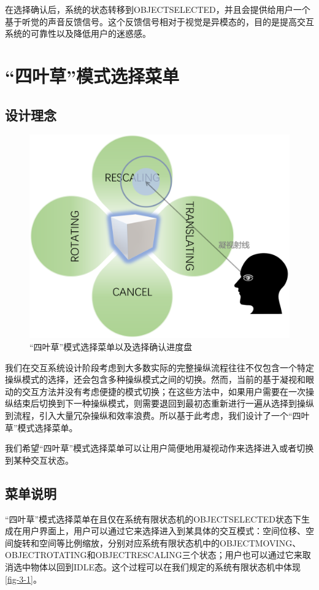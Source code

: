 在选择确认后，系统的状态转移到OBJECT\us SELECTED，并且会提供给用户一个基于听觉的声音反馈信号。这个反馈信号相对于视觉是异模态的，目的是提高交互系统的可靠性以及降低用户的迷惑感。

\section{“四叶草”模式选择菜单}
\label{Clover}

\subsection{设计理念}

\begin{figure}[t!]
    \centering
    \includegraphics[width=.55\textwidth]{figure/clover.png}
    \caption{“四叶草”模式选择菜单以及选择确认进度盘}
    \label{fig-3-4}
\end{figure}

我们在交互系统设计阶段考虑到大多数实际的完整操纵流程往往不仅包含一个特定操纵模式的选择，还会包含多种操纵模式之间的切换。然而，当前的基于凝视和眼动的交互方法并没有考虑便捷的模式切换；在这些方法中，如果用户需要在一次操纵结束后切换到下一种操纵模式，则需要退回到最初态重新进行一遍从选择到操纵到流程，引入大量冗杂操纵和效率浪费。所以基于此考虑，我们设计了一个“四叶草”模式选择菜单。

我们希望“四叶草”模式选择菜单可以让用户简便地用凝视动作来选择进入或者切换到某种交互状态。

\subsection{菜单说明}

“四叶草”模式选择菜单在且仅在系统有限状态机的OBJECT\us SELECTED状态下生成在用户界面上，用户可以通过它来选择进入到某具体的交互模式：空间位移、空间旋转和空间等比例缩放，分别对应系统有限状态机中的OBJECT\us MOVING、OBJECT\us ROTATING和OBJECT\us RESCALING三个状态；用户也可以通过它来取消选中物体以回到IDLE态。这个过程可以在我们规定的系统有限状态机中体现\ref{fig-3-1}。

